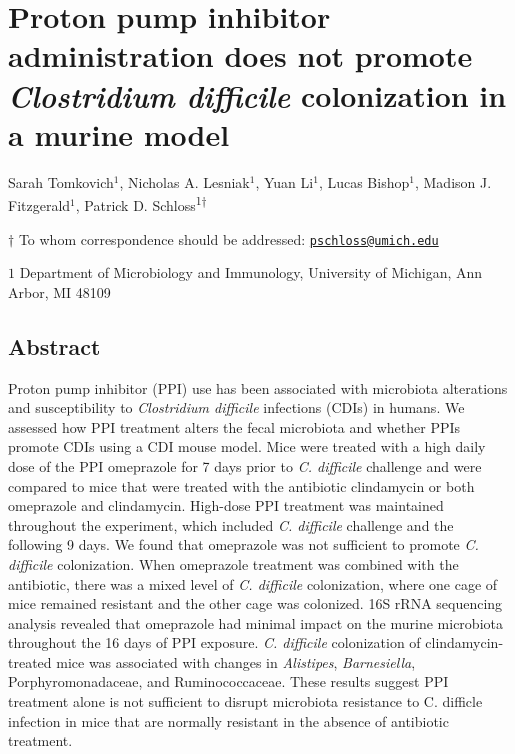 \documentclass[11pt,]{article}
\title{}
\author{}
\date{}
\begin{document}
\vspace{35mm}

\section{\texorpdfstring{Proton pump inhibitor administration does not
promote \emph{Clostridium difficile} colonization in a murine
model}{Proton pump inhibitor administration does not promote Clostridium difficile colonization in a murine model}}\label{proton-pump-inhibitor-administration-does-not-promote-clostridium-difficile-colonization-in-a-murine-model}

\vspace{35mm}

Sarah Tomkovich\({^1}\), Nicholas A. Lesniak\({^1}\), Yuan Li\({^1}\),
Lucas Bishop\({^1}\), Madison J. Fitzgerald\({^1}\), Patrick D.
Schloss\textsuperscript{1\(\dagger\)}

\vspace{40mm}

\(\dagger\) To whom correspondence should be addressed:
\href{mailto:pschloss@umich.edu}{\nolinkurl{pschloss@umich.edu}}

\(1\) Department of Microbiology and Immunology, University of Michigan,
Ann Arbor, MI 48109

\newpage

\linenumbers

\subsection{Abstract}\label{abstract}

Proton pump inhibitor (PPI) use has been associated with microbiota
alterations and susceptibility to \emph{Clostridium difficile}
infections (CDIs) in humans. We assessed how PPI treatment alters the
fecal microbiota and whether PPIs promote CDIs using a CDI mouse model.
Mice were treated with a high daily dose of the PPI omeprazole for 7
days prior to \emph{C. difficile} challenge and were compared to mice
that were treated with the antibiotic clindamycin or both omeprazole and
clindamycin. High-dose PPI treatment was maintained throughout the
experiment, which included \emph{C. difficile} challenge and the
following 9 days. We found that omeprazole was not sufficient to promote
\emph{C. difficile} colonization. When omeprazole treatment was combined
with the antibiotic, there was a mixed level of \emph{C. difficile}
colonization, where one cage of mice remained resistant and the other
cage was colonized. 16S rRNA sequencing analysis revealed that
omeprazole had minimal impact on the murine microbiota throughout the 16
days of PPI exposure. \emph{C. difficile} colonization of
clindamycin-treated mice was associated with changes in
\emph{Alistipes}, \emph{Barnesiella}, Porphyromonadaceae, and
Ruminococcaceae. These results suggest PPI treatment alone is not
sufficient to disrupt microbiota resistance to C. difficle infection in
mice that are normally resistant in the absence of antibiotic treatment.
\end{document}
